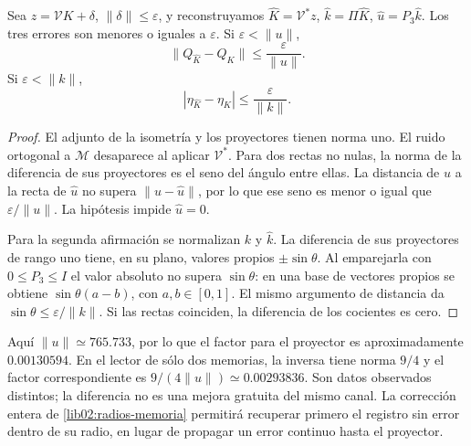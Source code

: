 \begin{theorem}
\label{lib01:error-proyectores}
Sea \(z=\mathcal VK+\delta\), \(\|\delta\|\leq\varepsilon\),
y reconstruyamos
\(\widehat K=\mathcal V^*z\), \(\widehat k=\Pi\widehat K\),
\(\widehat u=P_3\widehat k\). Los tres errores son menores o iguales
a \(\varepsilon\). Si \(\varepsilon<\|u\|\),
\[
 \|Q_{\widehat K}-Q_K\|\leq\frac\varepsilon{\|u\|}.
\]
Si \(\varepsilon<\|k\|\),
\[
 |\eta_{\widehat K}-\eta_K|\leq\frac\varepsilon{\|k\|}.
\]
\end{theorem}
\begin{proof}
El adjunto de la isometría y los proyectores tienen norma uno. El ruido
ortogonal a \(\mathcal M\) desaparece al aplicar \(\mathcal V^*\).
Para dos rectas no nulas, la norma de la diferencia de sus proyectores es
el seno del ángulo entre ellas. La distancia de \(u\) a la recta de
\(\widehat u\) no supera \(\|u-\widehat u\|\), por lo que ese
seno es menor o igual que \(\varepsilon/\|u\|\). La hipótesis
impide \(\widehat u=0\).

Para la segunda afirmación se normalizan \(k\) y \(\widehat k\).
La diferencia de sus proyectores de rango uno tiene, en su plano, valores
propios \(\pm\sin\theta\). Al emparejarla con \(0\leq P_3\leq I\)
el valor absoluto no supera \(\sin\theta\): en una base de vectores
propios se obtiene \(\sin\theta(a-b)\), con \(a,b\in[0,1]\).
El mismo argumento de distancia da
\(\sin\theta\leq\varepsilon/\|k\|\). Si las rectas coinciden,
la diferencia de los cocientes es cero.
\end{proof}

Aquí \(\|u\|\simeq765.733\), por lo que el factor para el proyector
es aproximadamente \(0.00130594\). En el lector de sólo dos memorias,
la inversa tiene norma \(9/4\) y el factor correspondiente es
\(9/(4\|u\|)\simeq0.00293836\). Son datos observados distintos;
la diferencia no es una mejora gratuita del mismo canal. La corrección
entera de \cref{lib02:radios-memoria} permitirá recuperar primero el
registro sin error dentro de su radio, en lugar de propagar un error
continuo hasta el proyector.

